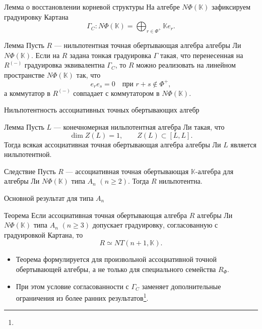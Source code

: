 \documentclass[12pt,aspectratio=169]{beamer}
\newcommand{\K}{\mathbb{K}}
\newcommand{\sourcefootnote}[1]{\footnote{\slidecite{#1}}}
\begin{document}
\begin{frame}[t]{Лемма о восстановлении корневой структуры}
    На алгебре $N\Phi(\mathbb{K})$ зафиксируем градуировку Картана
    \[
        \Gamma_C\colon N\Phi(\mathbb{K})=
        \bigoplus_{r\in\Phi^+}\mathbb{K}e_r.
    \]
    \begin{block}{Лемма}
        Пусть $R$ --- нильпотентная точная обертывающая алгебра алгебры Ли $N\Phi(\K)$. Если на $R$ задана тонкая градуировка $\Gamma$ такая, что перенесенная на $R^{(-)}$ градуировка эквивалентна $\Gamma_C$, то $R$ можно реализовать на линейном пространстве $N\Phi(\K)$ так, что
        \[
            e_r e_s=0\quad \text{при } r+s\notin\Phi^+,
        \]
        а коммутатор в $R^{(-)}$ совпадает с коммутатором в $N\Phi(\K)$.
    \end{block}
\end{frame}

\begin{frame}[t]{Нильпотентность ассоциативных точных обертывающих алгебр}
    \begin{block}{Лемма}
        Пусть $L$ --- конечномерная нильпотентная алгебра Ли такая, что
        \[
            \dim Z(L)=1,\qquad Z(L)\subset [L,L].
        \]
        Тогда всякая ассоциативная точная обертывающая алгебра алгебры Ли $L$ является
        нильпотентной.
    \end{block}

    \begin{block}{Следствие}
        Пусть $R$ --- ассоциативная точная обертывающая $\K$-алгебра для алгебры Ли $N\Phi(\K)$ типа $A_n$ $(n\ge 2)$. Тогда $R$ нильпотентна.
    \end{block}
\end{frame}

\begin{frame}[t]{Основной результат для типа $A_n$}
    \begin{alertblock}{Теорема}
        Если ассоциативная точная обертывающая алгебра $R$ алгебры Ли $N\Phi(\K)$ типа $A_n$ $(n\ge 3)$ допускает градуировку, согласованную с градуировкой Картана, то
        \[
            R \simeq NT(n+1,\K).
        \]
    \end{alertblock}

    \begin{itemize}
        \item Теорема формулируется для произвольной ассоциативной точной обертывающей
              алгебры, а не только для специального семейства $R_\Phi$.
        \item При этом условие согласованности с $\Gamma_C$ заменяет дополнительные
              ограничения из более ранних результатов\sourcefootnote{imm2020,smj2023}.
    \end{itemize}
\end{frame}
\end{document}
